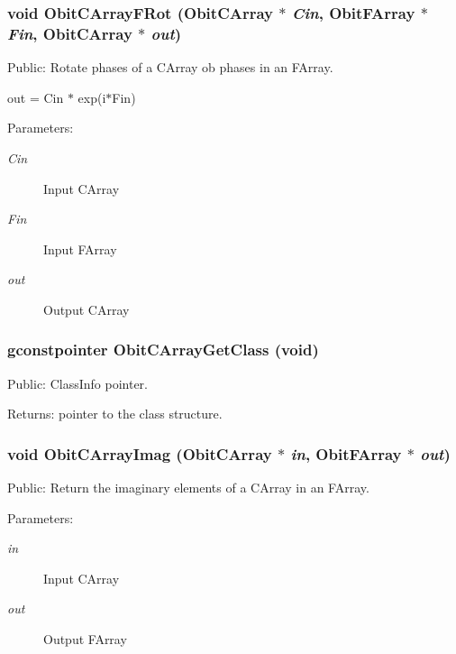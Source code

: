 \subsubsection{\setlength{\rightskip}{0pt plus 5cm}void Obit\-CArray\-FRot ({\bf Obit\-CArray} $\ast$ {\em Cin}, {\bf Obit\-FArray} $\ast$ {\em Fin}, {\bf Obit\-CArray} $\ast$ {\em out})}\label{ObitCArray_8c_a32}


Public: Rotate phases of a CArray ob phases in an FArray. 

out = Cin $\ast$ exp(i$\ast$Fin) \begin{Desc}
\item[Parameters:]
\begin{description}
\item[{\em Cin}]Input CArray \item[{\em Fin}]Input FArray \item[{\em out}]Output CArray \end{description}
\end{Desc}
\subsubsection{\setlength{\rightskip}{0pt plus 5cm}gconstpointer Obit\-CArray\-Get\-Class (void)}\label{ObitCArray_8c_a7}


Public: Class\-Info pointer. 

\begin{Desc}
\item[Returns:]pointer to the class structure. \end{Desc}
\subsubsection{\setlength{\rightskip}{0pt plus 5cm}void Obit\-CArray\-Imag ({\bf Obit\-CArray} $\ast$ {\em in}, {\bf Obit\-FArray} $\ast$ {\em out})}\label{ObitCArray_8c_a35}


Public: Return the imaginary elements of a CArray in an FArray. 

\begin{Desc}
\item[Parameters:]
\begin{description}
\item[{\em in}]Input CArray \item[{\em out}]Output FArray \end{description}
\end{Desc}
